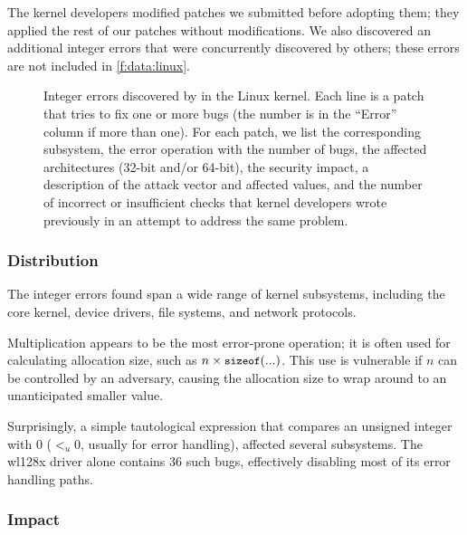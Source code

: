 The kernel developers modified \nrpatchesmod patches we submitted
before adopting them; they applied the rest of our patches without
modifications.
%
We also discovered an additional \nrbugsbyothers integer errors that
were concurrently discovered by others; these errors are not included
in \autoref{f:data:linux}.

\begin{figure*}
\centering
\footnotesize

\caption{Integer errors discovered by \sys in the Linux
kernel.  Each line is a patch that tries to fix one
or more bugs (the number is in the ``Error'' column if more than
one).  For each patch, we list the corresponding subsystem, the
error operation with the number of bugs, the affected architectures
(32-bit and/or 64-bit), the security impact, a
description of the attack vector and affected values, and the number
of incorrect or insufficient checks that kernel developers wrote
previously in an attempt to address the same problem.}
\label{f:data:linux}
\end{figure*}

\subsubsection{Distribution}

The integer errors \sys found span a wide range of kernel subsystems,
including the core kernel, device drivers, file systems, and network
protocols.

Multiplication appears to be the most error-prone operation; it is
often used for calculating allocation size, such as $n \times
\cc{sizeof}(...)$.  This use is vulnerable if $n$ can be controlled
by an adversary, causing the allocation size to wrap around to an
unanticipated smaller value.

Surprisingly,  a simple tautological expression that 
compares an unsigned integer with 0 ($<_u 0$, usually for error handling),
affected several subsystems.
The wl128x driver alone contains 36 such bugs, effectively
disabling most of its error handling paths.

\subsubsection{Impact}

